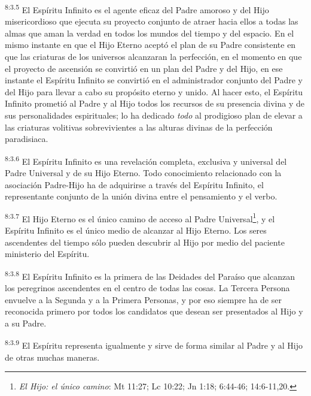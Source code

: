 \par
\textsuperscript{8:3.5} El Espíritu Infinito es el agente eficaz del Padre amoroso y del Hijo misericordioso que ejecuta su proyecto conjunto de atraer hacia ellos a todas las almas que aman la verdad en todos los mundos del tiempo y del espacio. En el mismo instante en que el Hijo Eterno aceptó el plan de su Padre consistente en que las criaturas de los universos alcanzaran la perfección, en el momento en que el proyecto de ascensión se convirtió en un plan del Padre y del Hijo, en ese instante el Espíritu Infinito se convirtió en el administrador conjunto del Padre y del Hijo para llevar a cabo su propósito eterno y unido. Al hacer esto, el Espíritu Infinito prometió al Padre y al Hijo todos los recursos de su presencia divina y de sus personalidades espirituales; lo ha dedicado \textit{todo} al prodigioso plan de elevar a las criaturas volitivas sobrevivientes a las alturas divinas de la perfección paradisiaca.

\par
\textsuperscript{8:3.6} El Espíritu Infinito es una revelación completa, exclusiva y universal del Padre Universal y de su Hijo Eterno. Todo conocimiento relacionado con la asociación Padre-Hijo ha de adquirirse a través del Espíritu Infinito, el representante conjunto de la unión divina entre el pensamiento y el verbo.

\par
\textsuperscript{8:3.7} El Hijo Eterno es el único camino de acceso al Padre Universal\footnote{\textit{El Hijo: el único camino}: Mt 11:27; Lc 10:22; Jn 1:18; 6:44-46; 14:6-11,20.}, y el Espíritu Infinito es el único medio de alcanzar al Hijo Eterno. Los seres ascendentes del tiempo sólo pueden descubrir al Hijo por medio del paciente ministerio del Espíritu.

\par
\textsuperscript{8:3.8} El Espíritu Infinito es la primera de las Deidades del Paraíso que alcanzan los peregrinos ascendentes en el centro de todas las cosas. La Tercera Persona envuelve a la Segunda y a la Primera Personas, y por eso siempre ha de ser reconocida primero por todos los candidatos que desean ser presentados al Hijo y a su Padre.

\par
\textsuperscript{8:3.9} El Espíritu representa igualmente y sirve de forma similar al Padre y al Hijo de otras muchas maneras.

